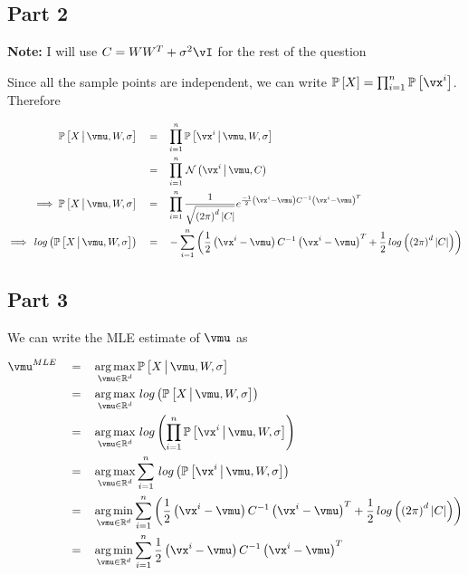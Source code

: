 \documentclass{article}
\begin{document}
\begin{mlsolution}
	\subsection*{Part 2}
	\begin{addmargin}{1.5em}

		\textbf{Note:} I will use $C = W W^T + \sigma^2 \iden$ for the rest of the question

		Since all the sample points are independent, we can write $\prob{X} = \prod_{i = 1}^{n} \prob{\vx^i}$. Therefore

		\begin{align*}
			\prob{X \pipe \vmu, W, \sigma}			\eq&	\prod_{i = 1}^{n} \prob{\vx^i \pipe \vmu, W, \sigma} \\
													\eq&	\prod_{i = 1}^{n} \ND{\vx^i \pipe \vmu, C} \\
			\implies \prob{X \pipe \vmu, W, \sigma}	\eq&	\prod_{i = 1}^{n} \frac{1}{\sqrt{\para{2 \pi}^d \abs{C}}} \exp{\frac{-1}{2} \para{\vx^i - \vmu} C^{-1} \para{\vx^i - \vmu}^T} \\
			\implies \log{\prob{X \pipe \vmu, W, \sigma}}	\eq&	- \sum_{i = 1}^{n} \para{\frac{1}{2} \para{\vx^i - \vmu} C^{-1} \para{\vx^i - \vmu}^T + \frac{1}{2} \log{\para{2 \pi}^d \abs{C}}} \\
		\end{align*}

	\end{addmargin}

	\subsection*{Part 3}
	\begin{addmargin}{1.5em}

		We can write the MLE estimate of $\vmu$ as

		\begin{align*}
			\vmu^{MLE}	\eq&	\argmax_{\vmu \in \R^d} \prob{X \pipe \vmu, W, \sigma} \\
						\eq&	\argmax_{\vmu \in \R^d} \log{\prob{X \pipe \vmu, W, \sigma}} \\
						\eq&	\argmax_{\vmu \in \R^d} \log{\prod_{i = 1}^{n} \prob{\vx^i \pipe \vmu, W, \sigma}} \\
						\eq&	\argmax_{\vmu \in \R^d} \sum_{i = 1}^{n} \log{\prob{\vx^i \pipe \vmu, W, \sigma}} \\
					\eq&	\argmin_{\vmu \in \R^d} \sum_{i = 1}^{n} \para{\frac{1}{2} \para{\vx^i - \vmu} C^{-1} \para{\vx^i - \vmu}^T + \frac{1}{2} \log{\para{2 \pi}^d \abs{C}}} \\
						\eq&	\argmin_{\vmu \in \R^d}	\sum_{i = 1}^{n} \frac{1}{2} \para{\vx^i - \vmu} C^{-1} \para{\vx^i - \vmu}^T
		\end{align*}


\end{addmargin}
\end{mlsolution}
\end{document}
